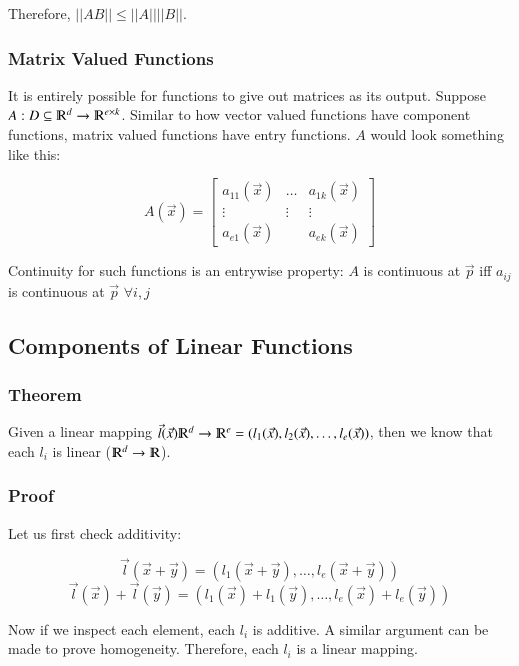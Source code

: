 \documentclass [12 pt, twoside] {book}
\newcommand\+{\text{ }}
\begin{document}
Therefore, $||AB|| \leq ||A|| ||B||$.

\subsubsection{Matrix Valued Functions}

It is entirely possible for functions to give out matrices as its output.
Suppose $A : D \subseteq \varmathbb{R}^d \to \varmathbb{R}^{e \times k}$.
Similar to how vector valued functions have component functions, matrix valued
functions have entry functions. $A$ would look something like this:

\[
    A(\vec{x}) = \left[\begin{array}{ccc}
            a_{11}(\vec{x}) & \dots & a_{1k}(\vec{x})\\
            \vdots & \vdots & \vdots \\
            a_{e1}(\vec{x}) & & a_{ek}(\vec{x})
    \end{array}\right]
\]

Continuity for such functions is an entrywise property: $A$ is continuous at
$\vec{p}$ iff $a_{ij}$ is continuous at $\vec{p}$ $\forall i, j$

\subsection{Components of Linear Functions}
\subsubsection{Theorem}

Given a linear mapping $\vec{l}(\vec{x}) \varmathbb{R}^d \to \varmathbb{R}^e = (l_1(\vec{x}), l_2(\vec{x}),
\dots, l_e(\vec{x}))$, then we know that each $l_i$ is linear ($\varmathbb{R}^d
\to \varmathbb{R}$).

\subsubsection{Proof}

Let us first check additivity:

\[
    \vec{l}(\vec{x} + \vec{y}) = (l_1(\vec{x} + \vec{y}), \dots, l_e(\vec{x} +
    \vec{y}))
\]
\[
    \vec{l}(\vec{x}) + \vec{l}(\vec{y}) = (l_1(\vec{x}) + l_1(\vec{y}), \dots,
    l_e(\vec{x}) + l_e(\vec{y}))
\]

Now if we inspect each element, each $l_i$ is additive. A similar argument can
be made to prove homogeneity. Therefore, each $l_i$ is a linear mapping.
\end{document}

